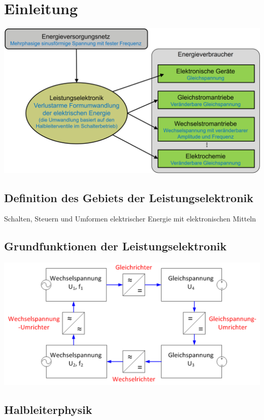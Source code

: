 \section{Einleitung}

\includegraphics[width=\columnwidth]{images/Bild0.png}

\subsection{Definition des Gebiets der Leistungselektronik}
Schalten, Steuern und Umformen elektrischer Energie mit elektronischen Mitteln

\subsection{Grundfunktionen der Leistungselektronik}
\includegraphics[width=\columnwidth]{images/Bild1.png}

\subsection{Halbleiterphysik}

